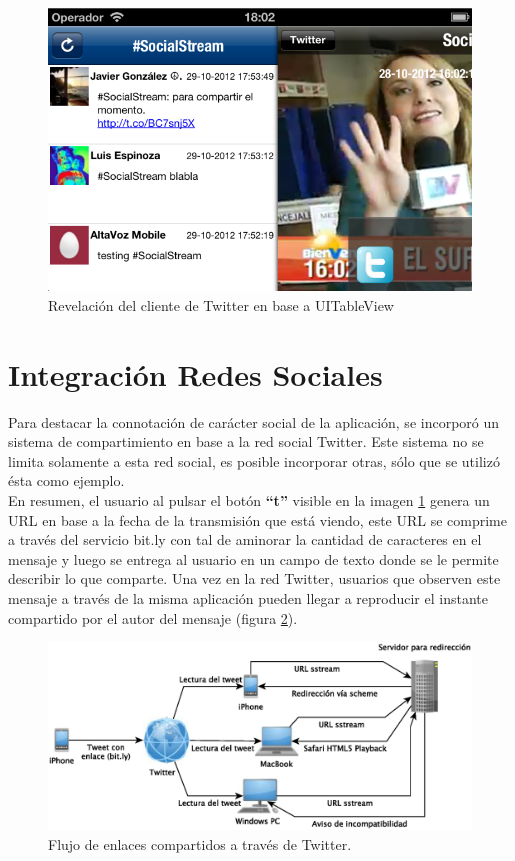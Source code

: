 \begin{figure}[H]
	\centering
	\includegraphics[scale=0.4]{imgs/sshot-twitterclientvc.png}
	\caption{Revelación del cliente de Twitter en base a UITableView}	
	\label{sshot-twitterclientvc}
\end{figure}
 
 
\section{Integración Redes Sociales}
	Para destacar la connotación de carácter social de la aplicación, se incorporó un sistema de compartimiento en base a la red social Twitter. Este sistema no se limita solamente a esta red social, es posible incorporar otras, sólo que se utilizó ésta como ejemplo.\\
	
	En resumen, el usuario al pulsar el botón \textbf{\textquotedblleft t\textquotedblright} visible en la imagen \ref{sshot-twitterclientvc} genera un URL en base a la fecha de la transmisión que está viendo, este URL se comprime a través del servicio bit.ly con tal de aminorar la cantidad de caracteres en el mensaje y luego se entrega al usuario en un campo de texto donde se le permite describir lo que comparte. Una vez en la red Twitter, usuarios que observen este mensaje a través de la misma aplicación pueden llegar a reproducir el instante compartido por el autor del mensaje (figura \ref{diagramaTwitterShare}).
	
	\begin{figure}[H]
		\centering
		\includegraphics[scale=0.6]{imgs/twitter-share-diagram.eps}
		\caption{Flujo de enlaces compartidos a través de Twitter.}
		\label{diagramaTwitterShare}
	\end{figure}		
	
